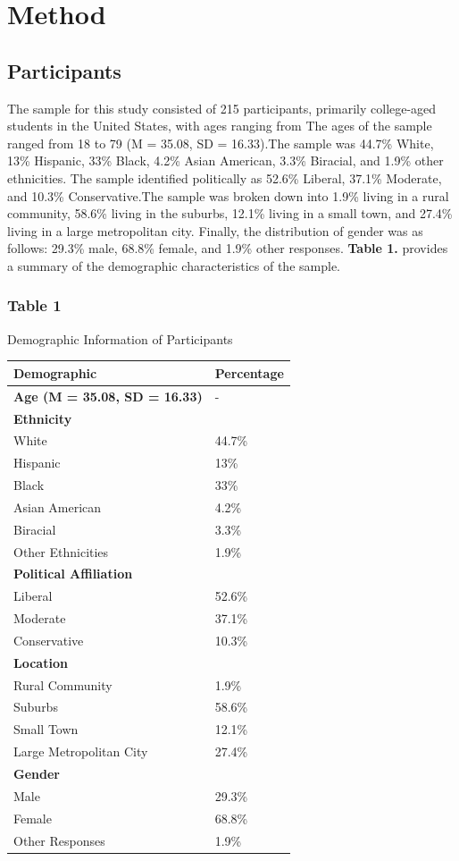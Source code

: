 \documentclass[
  man,
  floatsintext,
  longtable,
  nolmodern,
  notxfonts,
  notimes,
  colorlinks=true,linkcolor=blue,citecolor=blue,urlcolor=blue]{apa7}
\begin{document}
\section{Method}\label{method}

\subsection{Participants}\label{participants}

The sample for this study consisted of 215 participants, primarily
college-aged students in the United States, with ages ranging from The
ages of the sample ranged from 18 to 79 (M = 35.08, SD = 16.33).The
sample was 44.7\% White, 13\% Hispanic, 33\% Black, 4.2\% Asian
American, 3.3\% Biracial, and 1.9\% other ethnicities. The sample
identified politically as 52.6\% Liberal, 37.1\% Moderate, and 10.3\%
Conservative.The sample was broken down into 1.9\% living in a rural
community, 58.6\% living in the suburbs, 12.1\% living in a small town,
and 27.4\% living in a large metropolitan city. Finally, the
distribution of gender was as follows: 29.3\% male, 68.8\% female, and
1.9\% other responses. \textbf{Table 1.} provides a summary of the
demographic characteristics of the sample.

\subsubsection{Table 1}\label{table-1}

Demographic Information of Participants

\begin{longtable}[]{@{}ll@{}}
\toprule\noalign{}
\textbf{Demographic} & \textbf{Percentage} \\
\midrule\noalign{}
\endhead
\bottomrule\noalign{}
\endlastfoot
\textbf{Age (M = 35.08, SD = 16.33)} & - \\
\textbf{Ethnicity} & \\
White & 44.7\% \\
Hispanic & 13\% \\
Black & 33\% \\
Asian American & 4.2\% \\
Biracial & 3.3\% \\
Other Ethnicities & 1.9\% \\
\textbf{Political Affiliation} & \\
Liberal & 52.6\% \\
Moderate & 37.1\% \\
Conservative & 10.3\% \\
\textbf{Location} & \\
Rural Community & 1.9\% \\
Suburbs & 58.6\% \\
Small Town & 12.1\% \\
Large Metropolitan City & 27.4\% \\
\textbf{Gender} & \\
Male & 29.3\% \\
Female & 68.8\% \\
Other Responses & 1.9\% \\
\end{longtable}
\end{document}
